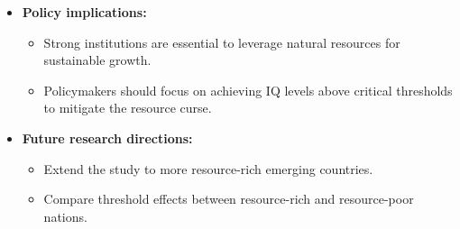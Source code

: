 \documentclass[10pt, oneside]{article}
\begin{document}
\begin{itemize}
	\item \textbf{Policy implications:}
	      \begin{itemize}
		      \item Strong institutions are essential to leverage natural resources for sustainable growth.
		      \item Policymakers should focus on achieving IQ levels above critical thresholds to mitigate the resource curse.
	      \end{itemize}
	\item \textbf{Future research directions:}
	      \begin{itemize}
		      \item Extend the study to more resource-rich emerging countries.
		      \item Compare threshold effects between resource-rich and resource-poor nations.
	      \end{itemize}
\end{itemize}
\printbibliography
\end{document}
